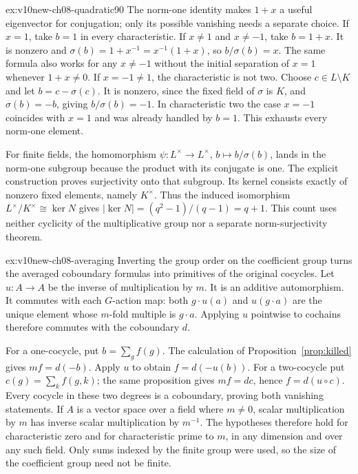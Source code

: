 \begin{solution}{ex:v10new-ch08-quadratic90}
\idea The norm-one identity makes $1+x$ a useful eigenvector for conjugation; only its possible vanishing needs a separate choice.
\writeup If $x=1$, take $b=1$ in every characteristic. If $x\ne1$ and $x\ne-1$, take $b=1+x$. It is nonzero and
$\sigma(b)=1+x^{-1}=x^{-1}(1+x)$, so $b/\sigma(b)=x$.
The same formula also works for any $x\ne-1$ without the initial separation of $x=1$ whenever $1+x\ne0$.
If $x=-1\ne1$, the characteristic is not two. Choose $c\in L\setminus K$ and let $b=c-\sigma(c)$. It is nonzero, since the fixed field of $\sigma$ is $K$, and $\sigma(b)=-b$, giving $b/\sigma(b)=-1$. In characteristic two the case $x=-1$ coincides with $x=1$ and was already handled by $b=1$. This exhausts every norm-one element.

For finite fields, the homomorphism
$\psi:L^\times\to L^\times$, $b\mapsto b/\sigma(b)$, lands in the norm-one subgroup because the product with its conjugate is one. The explicit construction proves surjectivity onto that subgroup. Its kernel consists exactly of nonzero fixed elements, namely $K^\times$. Thus the induced isomorphism
$L^\times/K^\times\cong\ker N$ gives
$|\ker N|=(q^2-1)/(q-1)=q+1$. This count uses neither cyclicity of the multiplicative group nor a separate norm-surjectivity theorem.
\end{solution}

\begin{solution}{ex:v10new-ch08-averaging}
\idea Inverting the group order on the coefficient group turns the averaged coboundary formulas into primitives of the original cocycles.
\writeup Let $u:A\to A$ be the inverse of multiplication by $m$. It is an additive automorphism. It commutes with each $G$-action map: both $g\cdot u(a)$ and $u(g\cdot a)$ are the unique element whose $m$-fold multiple is $g\cdot a$. Applying $u$ pointwise to cochains therefore commutes with the coboundary $d$.

For a one-cocycle, put $b=\sum_gf(g)$. The calculation of Proposition~\ref{prop:killed} gives $mf=d(-b)$. Apply $u$ to obtain
$f=d(-u(b))$. For a two-cocycle put $c(g)=\sum_kf(g,k)$; the same proposition gives $mf=dc$, hence $f=d(u\circ c)$. Every cocycle in these two degrees is a coboundary, proving both vanishing statements.
If $A$ is a vector space over a field where $m\ne0$, scalar multiplication by $m$ has inverse scalar multiplication by $m^{-1}$. The hypotheses therefore hold for characteristic zero and for characteristic prime to $m$, in any dimension and over any such field. Only sums indexed by the finite group were used, so the size of the coefficient group need not be finite.
\end{solution}

